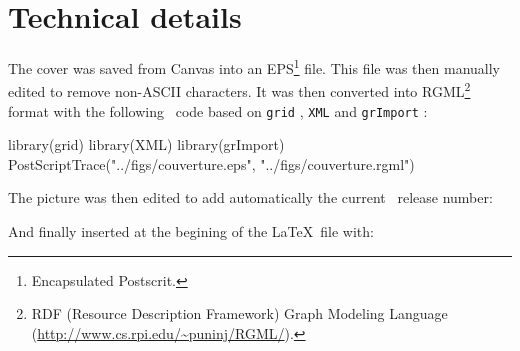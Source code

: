 \documentclass[a4paper]{article}
\begin{document}
\section*{Technical details}

The cover was saved from Canvas into an EPS\footnote{
Encapsulated Postscrit.
} file. This file was then manually 
edited to remove non-ASCII characters. It was then converted into RGML\footnote{
RDF (Resource Description Framework) Graph Modeling Language (\url{http://www.cs.rpi.edu/~puninj/RGML/}).
} format
with the following \Rlogo{}~code based on \texttt{grid} \cite{grid},
\texttt{XML} \cite{XML} and \texttt{grImport} \cite{grImport}:
 
\begin{Schunk}
\begin{Sinput}
 library(grid)
 library(XML)
 library(grImport)
 PostScriptTrace("../figs/couverture.eps", "../figs/couverture.rgml")
\end{Sinput}
\end{Schunk}

The picture was then edited to add automatically 
the current \seqinr{}~release number:


\begin{Schunk}
\end{Schunk}

And finally inserted at the begining of the \LaTeX~file with:
\end{document}
